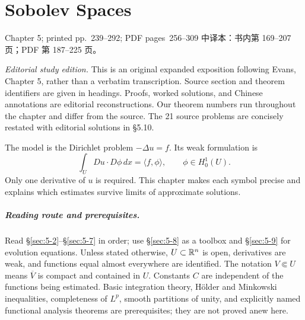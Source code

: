 \chapter{Sobolev Spaces}
\label{chap:sobolev-spaces}

\PDESource
  {Chapter 5; printed pp.~239--292; PDF pages~256--309}
  {中译本：书内第 169--207 页；PDF 第 187--225 页。}

\noindent\textit{Editorial study edition.}
This is an original expanded exposition following Evans, Chapter 5, rather
than a verbatim transcription. Source section and theorem identifiers are
given in headings. Proofs, worked solutions, and Chinese annotations are
editorial reconstructions. Our theorem numbers run throughout the chapter
and differ from the source. The 21 source problems are concisely restated
with editorial solutions in \S5.10.

\Needspace{45mm}
The model is the Dirichlet problem $-\Delta u=f$. Its weak formulation is
\[
 \int_U Du\cdot D\phi\,dx=\langle f,\phi\rangle,
 \qquad\phi\in H^1_0(U).
\]
Only one derivative of $u$ is required. This chapter makes each symbol
precise and explains which estimates survive limits of approximate solutions.

\paragraph{Reading route and prerequisites.}
Read \S\ref{sec:5-2}--\S\ref{sec:5-7} in order; use \S\ref{sec:5-8}
as a toolbox and \S\ref{sec:5-9} for evolution equations. Unless stated
otherwise, $U\subset\mathbb{R}^n$ is open, derivatives are weak, and functions equal
almost everywhere are identified. The notation $V\Subset U$ means
$\overline V$ is compact and contained in $U$. Constants $C$ are independent
of the functions being estimated. Basic integration theory, H\"older and
Minkowski inequalities, completeness of $L^p$, smooth partitions of unity,
and explicitly named functional analysis theorems are prerequisites;
they are not proved anew here.

\clearpage











